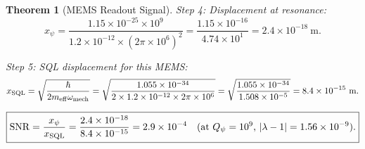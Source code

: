 \documentclass[11pt]{article}
\newcommand{\lam}{\lambda}
\newcommand{\ee}[1]{\times 10^{#1}}
\newcommand{\Qpsi}{Q_\psi}
\newcommand{\SNR}{\mathrm{SNR}}
\newcommand{\lbone}{|\lam - 1|}
\newtheorem{theorem}{Theorem}[section]
\theoremstyle{definition}
\theoremstyle{remark}
\begin{document}
\begin{theorem}[MEMS Readout Signal]
Step 4: Displacement at resonance:
\begin{equation}
x_\psi = \frac{1.15\ee{-25}\times 10^9}{1.2\ee{-12}\times(2\pi\ee{6})^2}
= \frac{1.15\ee{-16}}{4.74\ee{1}} = 2.4\ee{-18}~\text{m}.
\end{equation}

Step 5: SQL displacement for this MEMS:
\begin{equation}
x_{\rm SQL} = \sqrt{\frac{\hbar}{2 m_{\rm eff}\omega_{\rm mech}}}
= \sqrt{\frac{1.055\ee{-34}}{2\times 1.2\ee{-12}\times 2\pi\ee{6}}}
= \sqrt{\frac{1.055\ee{-34}}{1.508\ee{-5}}} = 8.4\ee{-15}~\text{m}.
\end{equation}

\begin{equation}
\boxed{
\SNR = \frac{x_\psi}{x_{\rm SQL}} = \frac{2.4\ee{-18}}{8.4\ee{-15}}
= 2.9\ee{-4}\quad\text{(at $\Qpsi = 10^9$, $\lbone = 1.56\ee{-9}$).}
}
\label{eq:SNR_MEMS}
\end{equation}
\end{theorem}
\end{document}

